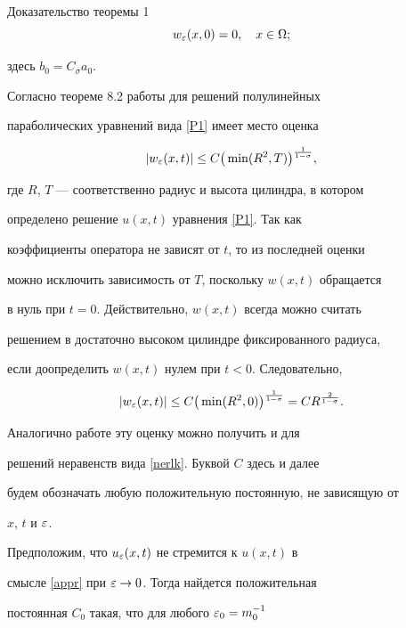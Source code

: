 \begin{pf*}{Доказательство теоремы 1}
\begin{equation}
w_\eps(x,0)=0,\quad x\in\Omega; \label{w02}


\end{equation}


здесь $b_0=C_{\sigma}a_0$.





Согласно теореме 8.2 работы \cite{Ch} для решений полулинейных


параболических уравнений вида \eqref{P1} имеет место оценка


$$


|w_\eps(x,t)|\le C\big(\min(R^2, T)\big)^{\frac1{1-\sigma}},


$$


где $R$, $T$ --- соответственно радиус и высота цилиндра, в котором


определено решение $u(x,t)$ уравнения \eqref{P1}. Так как


коэффициенты оператора не зависят от $t$, то из последней оценки


можно исключить зависимость от $T$, поскольку $w(x,t)$ обращается


в нуль при $t=0$. Действительно, $w(x,t)$ всегда можно считать


решением в достаточно высоком цилиндре фиксированного радиуса,


если доопределить $w(x,t)$ нулем при $t<0$. Следовательно,


\begin{equation}


|w_\eps(x,t)|\le C\big(\min(R^2,


0)\big)^{\frac1{1-\sigma}}=CR^{\frac2{1-\sigma}}. \label{u}


\end{equation}





Аналогично работе \cite{KL} эту оценку можно получить и для


решений неравенств вида \eqref{nerlk}. Буквой $C$ здесь и далее


будем обозначать любую положительную постоянную, не зависящую от


$x$, $t$ и $\varepsilon$.





Предположим, что $u_\varepsilon(x,t)$ не стремится к $u(x,t)$ в


смысле \eqref{appr} при $\varepsilon\to 0$. Тогда найдется положительная


постоянная $C_0$ такая, что для любого $\varepsilon_0=m_0^{-1}$



\end{pf*}
